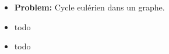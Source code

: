 \begin{frame}
    \frametitle{\problemtitle}
    \begin{itemize}
        \item<+-> \textbf{Problem:} Cycle eulérien dans un graphe.
        \item<+-> todo
        \item<+-> todo

    \end{itemize}
\end{frame}
